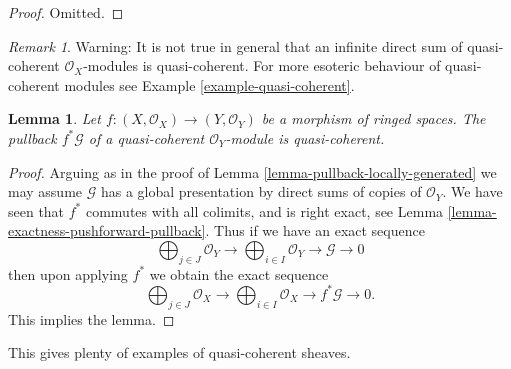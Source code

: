 \documentclass{stacks-project}
\theoremstyle{plain}
\newtheorem{lemma}[subsection]{Lemma}
\theoremstyle{definition}
\theoremstyle{remark}
\newtheorem{remark}[subsection]{Remark}
\numberwithin{equation}{subsection}
\begin{document}
\begin{proof}
Omitted.
\end{proof}

\begin{remark}
\label{remark-infinite-direct-sum-quasi-coherent-not}
Warning: It is not true in general that an infinite
direct sum of quasi-coherent $\mathcal{O}_X$-modules
is quasi-coherent. For more esoteric behaviour of quasi-coherent
modules see Example \ref{example-quasi-coherent}.
\end{remark}

\begin{lemma}
\label{lemma-pullback-quasi-coherent}
Let $f : (X, \mathcal{O}_X) \to (Y, \mathcal{O}_Y)$
be a morphism of ringed spaces.
The pullback $f^*\mathcal{G}$ of a quasi-coherent
$\mathcal{O}_Y$-module is quasi-coherent.
\end{lemma}

\begin{proof}
Arguing as in the proof of Lemma \ref{lemma-pullback-locally-generated}
we may assume $\mathcal{G}$ has a global presentation by
direct sums of copies of $\mathcal{O}_Y$.
We have seen that $f^*$ commutes with all colimits,
and is right exact, see Lemma \ref{lemma-exactness-pushforward-pullback}.
Thus if we have an exact sequence
$$
\bigoplus\nolimits_{j \in J}
\mathcal{O}_Y
\longrightarrow
\bigoplus\nolimits_{i \in I}
\mathcal{O}_Y
\longrightarrow
\mathcal{G}
\longrightarrow
0
$$
then upon applying $f^*$ we obtain the exact sequence
$$
\bigoplus\nolimits_{j \in J}
\mathcal{O}_X
\longrightarrow
\bigoplus\nolimits_{i \in I}
\mathcal{O}_X
\longrightarrow
f^*\mathcal{G}
\longrightarrow
0.
$$
This implies the lemma.
\end{proof}

\noindent
This gives plenty of examples of quasi-coherent sheaves.
\end{document}
